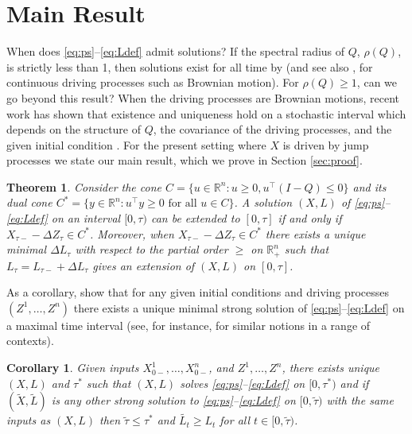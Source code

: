\documentclass[12pt]{article}
\newcommand{\R}{\mathbb{R}}
\newcommand{\wt}{\widetilde}
\theoremstyle{plain}
\newtheorem{theorem}{Theorem}
\newtheorem{corollary}{Corollary}
\theoremstyle{definition}
\theoremstyle{remark}
\begin{document}
\medskip

\section{Main Result}

When does \eqref{eq:ps}--\eqref{eq:Ldef} admit solutions? If the spectral radius of $Q$, $\rho(Q)$, is strictly less than 1, then solutions exist for all time by \cite[Proposition 1]{reiman_open_1984} (and see also \cite{harrison_reflected_1981}, for continuous driving processes such as Brownian motion). For $\rho(Q)\ge 1$, can we go beyond this result? When the driving processes are Brownian motions, recent work has shown that existence and uniqueness hold on a stochastic interval which depends on the structure of $Q$, the covariance of the driving processes, and the given initial condition \cite{baker_particle_2025}. For the present setting where $X$ is driven by jump processes we state our main result, which we prove in Section \ref{sec:proof}. 

\begin{theorem}\label{thm}
Consider the cone $C=\{u\in\R^n:u\ge 0, u^\top (I-Q)\le 0\}$ and its dual cone $C^*=\{y\in\R^n:u^\top y \ge 0 \text{ for all }u\in C\}$.
A solution $(X,L)$ of \eqref{eq:ps}--\eqref{eq:Ldef} on an interval $[0,\tau)$ can be extended to $[0,\tau]$ if and only if $X_{\tau-}-\Delta Z_\tau \in C^*$. Moreover, when $X_{\tau-}-\Delta Z_\tau \in C^*$ there exists a unique minimal $\Delta L_\tau$ with respect to the partial order $\ge$ on $\R_+^n$ such that $L_\tau=L_{\tau-}+\Delta L_\tau$ gives an extension of $(X,L)$ on $[0,\tau]$.
\end{theorem}

As a corollary, show that for any given initial conditions and driving processes $(Z^1,\dots,Z^n)$ there exists a unique minimal strong solution of \eqref{eq:ps}--\eqref{eq:Ldef} on a maximal time interval (see, for instance, \cite{delarue_particle_2015,cuchiero_propagation_2023,baker_particle_2025} for similar notions in a range of contexts).

\begin{corollary}\label{coro}
Given inputs $X_{0-}^1,\dots, X_{0-}^n$, and $Z^1,\dots,Z^n$, there exists unique $(X,L)$ and $\tau^*$ such that $(X,L)$ solves \eqref{eq:ps}--\eqref{eq:Ldef} on $[0,\tau^*)$ and if $(\wt{X},\wt{L})$ is any other strong solution to \eqref{eq:ps}--\eqref{eq:Ldef} on $[0,\wt\tau)$ with the same inputs as $(X,L)$ then $\wt\tau\le\tau^*$ and $\wt{L_t}\ge L_t$ for all $t\in[0,\wt\tau)$.
\end{corollary}
\end{document}
